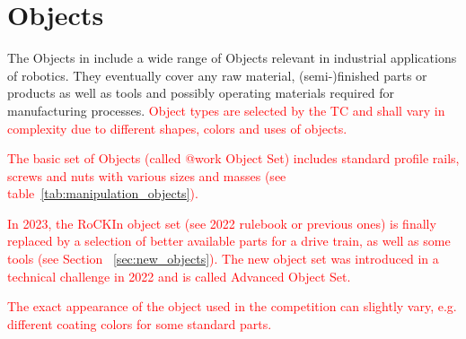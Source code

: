 \clearpage
\section{Objects} 
\label{ssec:ManipulationObjects}

The Objects in \RCAW include a wide range of Objects relevant in industrial applications of robotics. They eventually cover any raw material, (semi-)finished parts or products as well as tools and possibly operating materials required for manufacturing processes. \textcolor{red}{Object types are selected by the TC and shall vary in complexity due to different shapes, colors and uses of objects.}

\textcolor{red}{The basic set of Objects (called @work Object Set) includes standard profile rails, screws and nuts with various sizes and masses (see table~\ref{tab:manipulation_objects}).}

%


\textcolor{red}{In 2023, the RoCKIn object set (see 2022 rulebook or previous ones) is finally replaced by a selection of better available parts for a drive train, as well as some tools (see Section~
\ref{sec:new_objects}). The new object set was introduced in a technical challenge in 2022 and is called Advanced Object Set.}

\textcolor{red}{The exact appearance of the object used in the competition can slightly vary, e.g. different coating colors for some standard parts.}

